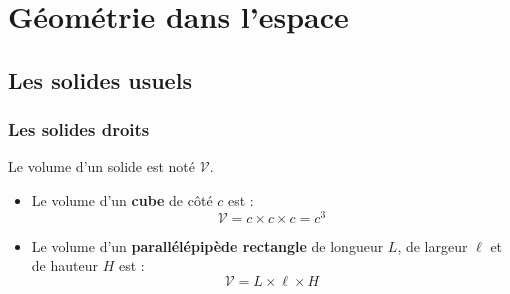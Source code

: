 \chapter{Géométrie dans l'espace}

\section{Les solides usuels}

\subsection{Les solides droits}

\begin{prop}

	Le volume d'un solide est noté $\mathcal{V}$.

	\begin{itemize}
		\item Le volume d'un \textbf{cube} de côté $c$ est :
		      \[
			      \mathcal{V} = c \times c \times c = c^3
		      \]

		\item Le volume d'un \textbf{parallélépipède rectangle} de longueur $L$, de largeur $\ell$ et de hauteur $H$ est :
		      \[
			      \mathcal{V} = L \times \ell \times H
		      \]


\end{itemize}
\end{prop}
